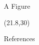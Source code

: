 \documentclass[14pt,final]{beamer}
\begin{document}
\begin{frame}{}
\begin{textblock}{16.6}
\begin{block}{A Figure}
\end{block}
\end{textblock}



\begin{textblock}{30}(21.8,30)
\begin{block}{References}
\tiny


\end{block}
\end{textblock}


\end{frame}
\end{document}
